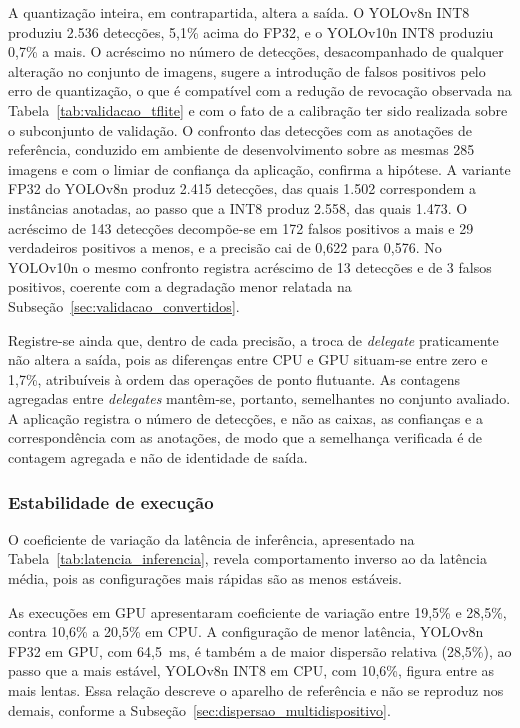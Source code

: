 \documentclass[artigo,times,capa]{iftex2024}
\begin{document}
\FloatBarrier

A quantização inteira, em contrapartida, altera a saída. O YOLOv8n \ac{INT8} produziu 2.536 detecções, 5,1\% acima do \ac{FP32}, e o YOLOv10n \ac{INT8} produziu 0,7\% a mais. O acréscimo no número de detecções, desacompanhado de qualquer alteração no conjunto de imagens, sugere a introdução de falsos positivos pelo erro de
quantização, o que é compatível com a redução de revocação observada na
Tabela~\ref{tab:validacao_tflite} e com o fato de a calibração ter sido
realizada sobre o subconjunto de validação. O confronto das detecções com as
anotações de referência, conduzido em ambiente de desenvolvimento sobre as
mesmas 285 imagens e com o limiar de confiança da aplicação, confirma a
hipótese. A variante \ac{FP32} do YOLOv8n produz 2.415 detecções, das quais
1.502 correspondem a instâncias anotadas, ao passo que a \ac{INT8} produz
2.558, das quais 1.473. O acréscimo de 143 detecções decompõe-se em 172 falsos
positivos a mais e 29 verdadeiros positivos a menos, e a precisão cai de 0,622
para 0,576. No YOLOv10n o mesmo confronto registra acréscimo de 13 detecções e
de 3 falsos positivos, coerente com a degradação menor relatada na
Subseção~\ref{sec:validacao_convertidos}.

Registre-se ainda que, dentro de cada precisão, a troca de \textit{delegate} praticamente não altera a saída, pois as diferenças entre \ac{CPU} e \ac{GPU} situam-se entre zero e 1,7\%, atribuíveis à ordem das operações de ponto flutuante. As contagens agregadas entre \textit{delegates} mantêm-se, portanto, semelhantes no conjunto avaliado. A aplicação registra o número de detecções, e não as caixas, as confianças e a correspondência com as anotações, de modo que a semelhança verificada é de contagem agregada e não de identidade de saída.

\subsubsection{Estabilidade de execução}
\label{sec:estabilidade}

O coeficiente de variação da latência de inferência, apresentado na Tabela~\ref{tab:latencia_inferencia}, revela comportamento inverso ao da latência média, pois as configurações mais rápidas são as menos estáveis.

As execuções em \ac{GPU} apresentaram coeficiente de variação entre 19,5\% e 28,5\%, contra 10,6\% a 20,5\% em \ac{CPU}. A configuração de menor latência, YOLOv8n \ac{FP32} em \ac{GPU}, com 64,5~ms, é também a de maior dispersão relativa (28,5\%), ao passo que a mais estável, YOLOv8n \ac{INT8} em \ac{CPU}, com
10,6\%, figura entre as mais lentas. Essa relação descreve o aparelho de
referência e não se reproduz nos demais, conforme a
Subseção~\ref{sec:dispersao_multidispositivo}.
\end{document}
